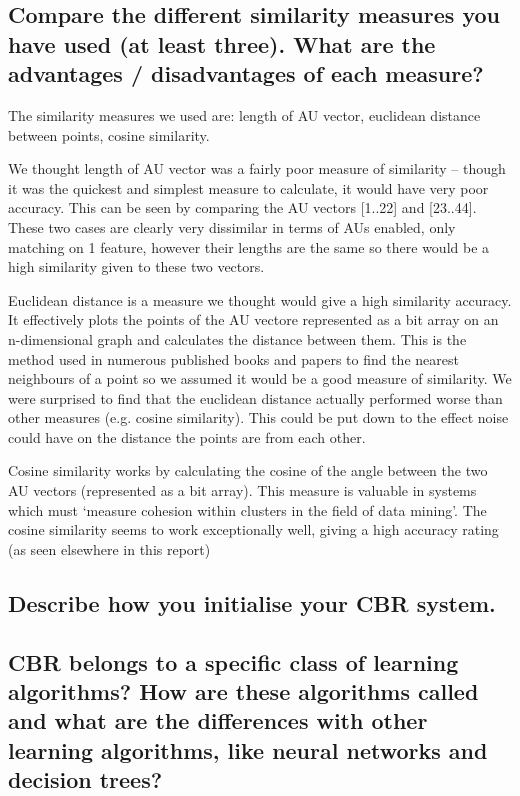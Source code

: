\documentclass[11pt]{article}
\begin{document}
\subsection{Compare the different similarity measures you have used (at least three). What are the advantages / disadvantages of each measure?}

The similarity measures we used are: length of AU vector, euclidean distance between points, 
cosine similarity.

We thought length of AU vector was a fairly poor measure of similarity -- though it was the
quickest and simplest measure to calculate, it would have very poor accuracy. This can be seen
by comparing the AU vectors [1..22] and [23..44]. These two cases are clearly very
dissimilar in terms of AUs enabled, only matching on 1 feature, however their lengths are
the same so there would be a high similarity given to these two vectors.

Euclidean distance is a measure we thought would give a high similarity accuracy. It
effectively plots the points of the AU vectore represented as a bit array
on an n-dimensional graph and calculates the
distance between them. This is the method used in numerous published books and papers
to find the nearest neighbours of a point so we assumed it would be a good measure of
similarity. We were surprised to find that the euclidean distance actually performed 
worse than other measures (e.g. cosine similarity). This could be put down to the effect
noise could have on the distance the points are from each other.

Cosine similarity works by calculating the cosine of the angle between the two AU vectors
(represented as a bit array). This measure is valuable in systems which must 
`measure cohesion within clusters in the field of data mining'. The cosine similarity
seems to work exceptionally well, giving a high accuracy rating (as seen elsewhere in this
report)

\subsection{Describe how you initialise your CBR system.}

\subsection{CBR belongs to a specific class of learning algorithms? How are these algorithms called and what are the differences with other learning algorithms, like neural networks and decision trees?}
\end{document}
